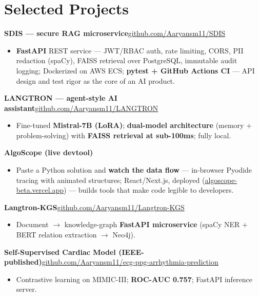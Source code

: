 \documentclass[10pt,a4paper]{article}
\begin{document}
\section*{Selected Projects}
\vspace{1pt}\textbf{SDIS --- secure RAG microservice}\hfill {\small\href{https://github.com/Aaryansm11/SDIS}{github.com/Aaryansm11/SDIS}}
\begin{itemize}
\item \textbf{FastAPI} REST service --- JWT/RBAC auth, rate limiting, CORS, PII redaction (spaCy), FAISS retrieval over PostgreSQL, immutable audit logging; Dockerized on AWS ECS; \textbf{pytest + GitHub Actions CI} --- API design and test rigor as the core of an AI product.
\end{itemize}
\vspace{1pt}\textbf{LANGTRON --- agent-style AI assistant}\hfill {\small\href{https://github.com/Aaryansm11/LANGTRON}{github.com/Aaryansm11/LANGTRON}}
\begin{itemize}
\item Fine-tuned \textbf{Mistral-7B (LoRA)}; \textbf{dual-model architecture} (memory + problem-solving) with \textbf{FAISS retrieval at sub-100ms}; fully local.
\end{itemize}
\vspace{1pt}\textbf{AlgoScope (live devtool)}
\begin{itemize}
\item Paste a Python solution and \textbf{watch the data flow} --- in-browser Pyodide tracing with animated structures; React/Next.js, deployed (\href{https://algoscope-beta.vercel.app}{algoscope-beta.vercel.app}) --- builds tools that make code legible to developers.
\end{itemize}
\vspace{1pt}\textbf{Langtron-KGS}\hfill {\small\href{https://github.com/Aaryansm11/Langtron-KGS}{github.com/Aaryansm11/Langtron-KGS}}
\begin{itemize}
\item Document $\rightarrow$ knowledge-graph \textbf{FastAPI microservice} (spaCy NER + BERT relation extraction $\rightarrow$ Neo4j).
\end{itemize}
\vspace{1pt}\textbf{Self-Supervised Cardiac Model (IEEE-published)}\hfill {\small\href{https://github.com/Aaryansm11/ecg-ppg-arrhythmia-prediction}{github.com/Aaryansm11/ecg-ppg-arrhythmia-prediction}}
\begin{itemize}
\item Contrastive learning on MIMIC-III; \textbf{ROC-AUC 0.757}; FastAPI inference server.
\end{itemize}
\end{document}
